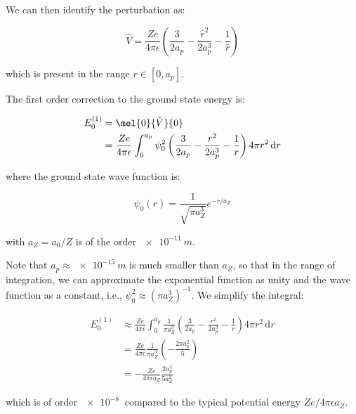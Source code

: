 \documentclass[12pt]{article}
\begin{document}
We can then identify the perturbation as:

\begin{equation}
    \hat{V} = \frac{Ze}{4\pi\epsilon} \left( \frac{3}{2a_{p}} - \frac{\hat{r}^{2}}{2a_{p}^{3}} - \frac{1}{\hat{r}} \right)
\end{equation}

which is present in the range $r \in [0, a_{p}]$.

The first order correction to the ground state energy is:

\begin{equation}
    \begin{split}
        E_{0}^{(1)} &= \mel{0}{\hat{V}}{0} \\
        &= \frac{Ze}{4\pi\epsilon} \int_{0}^{a_{p}} \psi_{0}^{2} \left( \frac{3}{2a_{p}} - \frac{r^{2}}{2a_{p}^{3}} - \frac{1}{r} \right) 4\pi r^{2} \, \mathrm{d}r \\
    \end{split}
\end{equation}

where the ground state wave function is:

\begin{equation}
    \psi_{0}(r) = \frac{1}{\sqrt{\pi a_{Z}^{3}}} e^{-r/a_{Z}}
\end{equation}

with $a_{Z} = a_{0}/Z$ is of the order $\qty{e-11}{m}$.

Note that $a_{p} \approx \qty{e-15}{m}$ is much smaller than $a_{Z}$, so that in the range of integration, we can approximate the exponential function as unity and the wave function as a constant, i.e., $\psi_{0}^{2} \approx (\pi a_{Z}^{3})^{-1}$. We simplify the integral:

\begin{equation}
    \begin{split}
        E_{0}^{(1)} &\approx \frac{Ze}{4\pi\epsilon} \int_{0}^{a_{p}} \frac{1}{\pi a_{Z}^{3}} \left( \frac{3}{2a_{p}} - \frac{r^{2}}{2a_{p}^{3}} - \frac{1}{r} \right) 4\pi r^{2} \, \mathrm{d}r \\
        &= \frac{Ze}{4\pi\epsilon} \frac{1}{\pi a_{Z}^{3}} \left( -\frac{2\pi a_{p}^{2}}{5} \right) \\
        &= -\frac{Ze}{4\pi\epsilon a_{Z}} \frac{2a_{p}^{2}}{5a_{Z}^{2}}
    \end{split}
\end{equation}

which is of order $\qty{e-8}{}$ compared to the typical potential energy $Ze/4\pi\epsilon a_{Z}$.
\end{document}
